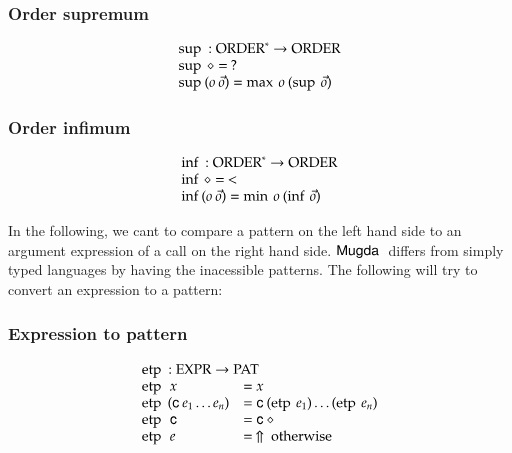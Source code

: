 \subsubsection{Order supremum}
\[
\begin{array}[t]{ll}
\multicolumn{2}{l}{\supo : \ves{\order} \ra \order}\\ 
\supo \diamond = \: ? \\
\supo (o \: \vec{o} ) = \maxo o \: (\supo \vec{o}) \\
\end{array}
\]

\subsubsection{Order infimum}
\[
\begin{array}[t]{ll}
\multicolumn{2}{l}{\info : \ves{\order} \ra \order}\\ 
\info \diamond = \: < \\
\info (o \: \vec{o} ) = \mino o \: (\info \vec{o}) \\
\end{array}
\]

\newcommand{\cmp}{\opn{cmp}}
\newcommand{\cmpv}{\opn{cmpv}}
\newcommand{\cmps}{\opn{cmps}}
\newcommand{\cmpsv}{\opn{cmpsv}}
\newcommand{\etp}{\opn{etp}\:}
\newcommand{\extr}{\opn{extract}\:}

In the following, we cant to compare a pattern on the left hand side to an argument expression of a call on the right hand side. 
$\textsf{Mugda }$ differs from simply typed languages by having the inacessible patterns.
The following will try to convert an expression to a pattern:
\subsubsection{Expression to pattern}
\[
\begin{array}[t]{ll}
\multicolumn{2}{l}{\etp : \Expr \ra \Pat}\\ 
\etp \: x & = x \\
\etp \: (\cc \: e_1 \ldots e_n ) & = \cc \: (\etp e_1) \ldots (\etp e_n) \\
\etp \: \cc & = \cc \: \diamond \\
\etp \: e & = \stuck \mbox{ otherwise}
\end{array}
\]

